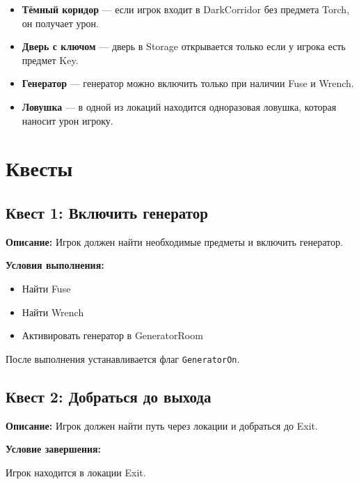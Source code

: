 \documentclass[a4paper,12pt]{article}
\begin{document}
\begin{itemize}

\item \textbf{Тёмный коридор} — если игрок входит в DarkCorridor без предмета Torch, он получает урон.

\item \textbf{Дверь с ключом} — дверь в Storage открывается только если у игрока есть предмет Key.

\item \textbf{Генератор} — генератор можно включить только при наличии Fuse и Wrench.

\item \textbf{Ловушка} — в одной из локаций находится одноразовая ловушка, которая наносит урон игроку.

\end{itemize}

\section{Квесты}

\subsection{Квест 1: Включить генератор}

\textbf{Описание:}  
Игрок должен найти необходимые предметы и включить генератор.

\textbf{Условия выполнения:}

\begin{itemize}
\item Найти Fuse
\item Найти Wrench
\item Активировать генератор в GeneratorRoom
\end{itemize}

После выполнения устанавливается флаг \texttt{GeneratorOn}.

\subsection{Квест 2: Добраться до выхода}

\textbf{Описание:}  
Игрок должен найти путь через локации и добраться до Exit.

\textbf{Условие завершения:}

Игрок находится в локации Exit.
\end{document}
